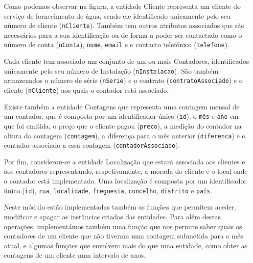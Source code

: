 Como podemos observar na figura, a entidade Cliente representa um cliente do serviço de fornecimento de água, sendo ele identificado unicamente pelo seu número de cliente (\texttt{nCliente}). Também tem outros atributos associados que são necessários para a sua identificação ou de forma a poder ser contactado como o número de conta (\texttt{nConta}), \texttt{nome}, \texttt{email} e o contacto telefónico (\texttt{telefone}).\par 
Cada cliente tem associado um conjunto de um ou mais Contadores, identificados unicamente pelo seu número de Instalação (\texttt{nInstalacao}). São também armazenados o número de série (\texttt{nSerie}) e o contrato (\texttt{contratoAssociado}) e o cliente (\texttt{nCliente}) aos quais o contador está associado.\par
Existe também a entidade Contagens que representa uma contagem mensal de um contador, que é composta por um identificador único (\texttt{id}), o \texttt{mês} e \texttt{ano} em que foi emitida, o preço que o cliente pagou (\texttt{preco}), a medição do contador na altura da contagem (\texttt{contagem}), a diferença para o mês anterior (\texttt{diferenca}) e o contador associado a essa contagem (\texttt{contadorAssociado}).\par
Por fim, considerou-se a entidade Localização que estará associada aos clientes e aos contadores representando, respetivamente, a morada do cliente e o local onde o contador está implementado. Uma localização é composta por um identificador único (\texttt{id}), \texttt{rua}, \texttt{localidade}, \texttt{freguesia}, \texttt{concelho}, \texttt{distrito} e \texttt{país}.\par 
Neste módulo estão implementadas também as funções que permitem aceder, modificar e apagar as instâncias criadas das entidades. Para além destas operações, implementámos também uma função que nos permite saber quais os contadores de um cliente que não tiveram uma contagem submetida para o mês atual, e algumas funções que envolvem mais do que uma entidade, como obter as contagens de um cliente num intervalo de anos.

